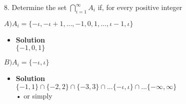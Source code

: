 \documentclass[11pt]{article}
\begin{document}
\begin{enumerate}

\begin{flushleft}
{\large 8. Determine the set  $\bigcap\limits_{i=1}^{\infty} A_{i}$ if, for every positive integer \iota }
\end{flushleft}

 \emph{$A) A_{i} = \{ - \iota, - \iota +1, ..., -1,0,1,...,\iota -1, \iota\}$}\\
 \begin{itemize}
\item \textbf{Solution}\\
\large $\{-1,0,1\} $\\
\end {itemize}


 \emph{$B) A_{i} = \{ - \iota, \iota\}$}\\
 \begin{itemize}
\item \textbf{Solution}\\
\large $ \{-1,1 \} \cap \{-2,2\} \cap \{-3,3\} \cap ...\{-\iota, \iota\} \cap ...\{ - \infty, \infty\} $\\
\large • or simply \emptyset\\


\end {itemize}
\end {enumerate}
\end{document}
